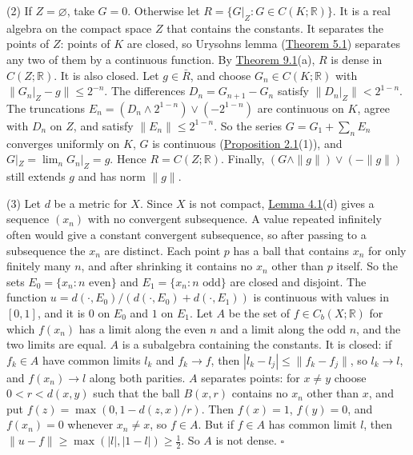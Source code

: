 \documentclass[
  english,
  11pt,
  a4paper,
]{article}
\begin{document}
(2) If \(Z=\varnothing\), take \(G=0\). Otherwise let
\(R=\{G|_Z:G\in C(K;\mathbb R)\}\). It is a real algebra on the compact
space \(Z\) that contains the constants. It separates the points of
\(Z\): points of \(K\) are closed, so Urysohn\textquotesingle s lemma
(\hyperlink{the-stone-weierstrass-theorem-for-functions-vanishing-at-infinity--oa-fnd-sw-16}{Theorem
5.1}) separates any two of them by a continuous function. By
\hyperlink{the-stone-weierstrass-theorem-for-functions-vanishing-at-infinity--oa-fnd-sw-07}{Theorem
9.1}(a), \(R\) is dense in \(C(Z;\mathbb R)\). It is also closed. Let
\(g\in\bar R\), and choose \(G_n\in C(K;\mathbb R)\) with
\(\|G_n|_Z-g\|\leq2^{-n}\). The differences \(D_n=G_{n+1}-G_n\) satisfy
\(\|D_n|_Z\|<2^{1-n}\). The truncations
\(E_n=(D_n\wedge2^{1-n})\vee(-2^{1-n})\) are continuous on \(K\), agree
with \(D_n\) on \(Z\), and satisfy \(\|E_n\|\leq2^{1-n}\). So the series
\(G=G_1+\sum_nE_n\) converges uniformly on \(K\), \(G\) is continuous
(\hyperlink{the-stone-weierstrass-theorem-for-functions-vanishing-at-infinity--oa-fnd-sw-01}{Proposition
2.1}(1)), and \(G|_Z=\lim_nG_n|_Z=g\). Hence \(R=C(Z;\mathbb R)\).
Finally, \((G\wedge\|g\|)\vee(-\|g\|)\) still extends \(g\) and has norm
\(\|g\|\).

(3) Let \(d\) be a metric for \(X\). Since \(X\) is not compact,
\hyperlink{the-stone-weierstrass-theorem-for-functions-vanishing-at-infinity--oa-fnd-sw-15}{Lemma
4.1}(d) gives a sequence \((x_n)\) with no convergent subsequence. A
value repeated infinitely often would give a constant convergent
subsequence, so after passing to a subsequence the \(x_n\) are distinct.
Each point \(p\) has a ball that contains \(x_n\) for only finitely many
\(n\), and after shrinking it contains no \(x_n\) other than \(p\)
itself. So the sets \(E_0=\{x_n:n\text{ even}\}\) and
\(E_1=\{x_n:n\text{ odd}\}\) are closed and disjoint. The function
\(u=d(\cdot,E_0)/(d(\cdot,E_0)+d(\cdot,E_1))\) is continuous with values
in \([0,1]\), and it is \(0\) on \(E_0\) and \(1\) on \(E_1\). Let \(A\)
be the set of \(f\in C_b(X;\mathbb R)\) for which \(f(x_n)\) has a limit
along the even \(n\) and a limit along the odd \(n\), and the two limits
are equal. \(A\) is a subalgebra containing the constants. It is closed:
if \(f_k\in A\) have common limits \(l_k\) and \(f_k\to f\), then
\(|l_k-l_j|\leq\|f_k-f_j\|\), so \(l_k\to l\), and \(f(x_n)\to l\) along
both parities. \(A\) separates points: for \(x\neq y\) choose
\(0<r<d(x,y)\) such that the ball \(B(x,r)\) contains no \(x_n\) other
than \(x\), and put \(f(z)=\max(0,1-d(z,x)/r)\). Then \(f(x)=1\),
\(f(y)=0\), and \(f(x_n)=0\) whenever \(x_n\neq x\), so \(f\in A\). But
if \(f\in A\) has common limit \(l\), then
\(\|u-f\|\geq\max(|l|,|1-l|)\geq\frac12\). So \(A\) is not dense.
\(\square\)
\end{document}
